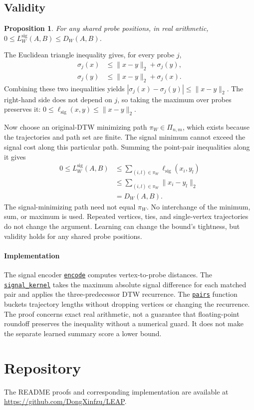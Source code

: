 \documentclass[10pt,conference,letterpaper]{IEEEtran}
\newtheorem{proposition}{Proposition}
\newcommand{\codefile}[2]{\href{https://github.com/DongXinfzu/LEAP/blob/main/#1}{\texttt{#2}}}
\begin{document}
\subsection{Validity}
\begin{proposition}
For any shared probe positions, in real arithmetic,
$0\leq L_W^{\mathrm{sig}}(A,B)\leq D_W(A,B)$.
\end{proposition}

\begin{IEEEproof}
The Euclidean triangle inequality gives, for every probe $j$,
\begin{equation}
\begin{aligned}
\sigma_j(x)&\leq\lVert x-y\rVert_2+\sigma_j(y),\\
\sigma_j(y)&\leq\lVert x-y\rVert_2+\sigma_j(x).
\end{aligned}
\end{equation}
Combining these two inequalities yields
$|\sigma_j(x)-\sigma_j(y)|\leq\lVert x-y\rVert_2$. The right-hand side
does not depend on $j$, so taking the maximum over probes preserves it:
$0\leq\ell_{\mathrm{sig}}(x,y)\leq\lVert x-y\rVert_2$.

Now choose an original-DTW minimizing path $\pi_W\in\Pi_{n,m}$, which
exists because the trajectories and path set are finite. The signal minimum
cannot exceed the signal cost along this particular path. Summing the
point-pair inequalities along it gives
\begin{equation}
\begin{aligned}
0\leq L_W^{\mathrm{sig}}(A,B)
&\leq\sum_{(i,l)\in\pi_W}\ell_{\mathrm{sig}}(x_i,y_l)\\
&\leq\sum_{(i,l)\in\pi_W}\lVert x_i-y_l\rVert_2\\
&=D_W(A,B).
\end{aligned}
\end{equation}
The signal-minimizing path need not equal $\pi_W$. No interchange of the
minimum, sum, or maximum is used. Repeated vertices, ties, and single-vertex
trajectories do not change the argument. Learning can change the bound's
tightness, but validity holds for any shared probe positions.
\end{IEEEproof}

\paragraph{Implementation}
The signal encoder
\codefile{01_LEAP/leap/dtw/dtw_signal.py}{encode}
computes vertex-to-probe distances. The
\codefile{01_LEAP/leap/dtw/dtw_signal.py}{signal\_kernel}
takes the maximum absolute signal difference for each matched pair and
applies the three-predecessor DTW recurrence. The
\codefile{01_LEAP/leap/dtw/dtw_signal_bucket.py}{pairs}
function buckets trajectory lengths without dropping vertices or changing
the recurrence. The proof concerns exact real arithmetic, not a guarantee that
floating-point roundoff preserves the inequality without a numerical guard.
It does not make the separate learned summary score a lower bound.

\section*{Repository}
The README proofs and corresponding implementation are available at
\url{https://github.com/DongXinfzu/LEAP}.
\end{document}
